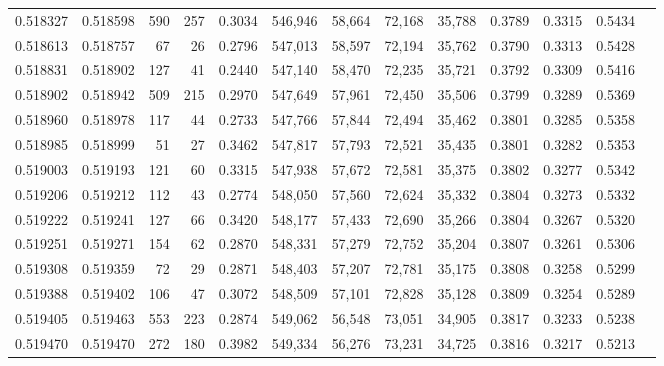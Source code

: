 \begin{tabular}{rrrrrrrrrrrrr}
0.518327 & 0.518598 &   590 &   257 &                                     0.3034 & 546,946 &  58,664 &  72,168 &  35,788 & 0.3789 & 0.3315 & 0.5434 \\
0.518613 & 0.518757 &    67 &    26 &                                     0.2796 & 547,013 &  58,597 &  72,194 &  35,762 & 0.3790 & 0.3313 & 0.5428 \\
0.518831 & 0.518902 &   127 &    41 &                                     0.2440 & 547,140 &  58,470 &  72,235 &  35,721 & 0.3792 & 0.3309 & 0.5416 \\
0.518902 & 0.518942 &   509 &   215 &                                     0.2970 & 547,649 &  57,961 &  72,450 &  35,506 & 0.3799 & 0.3289 & 0.5369 \\
0.518960 & 0.518978 &   117 &    44 &                                     0.2733 & 547,766 &  57,844 &  72,494 &  35,462 & 0.3801 & 0.3285 & 0.5358 \\
0.518985 & 0.518999 &    51 &    27 &                                     0.3462 & 547,817 &  57,793 &  72,521 &  35,435 & 0.3801 & 0.3282 & 0.5353 \\
0.519003 & 0.519193 &   121 &    60 &                                     0.3315 & 547,938 &  57,672 &  72,581 &  35,375 & 0.3802 & 0.3277 & 0.5342 \\
0.519206 & 0.519212 &   112 &    43 &                                     0.2774 & 548,050 &  57,560 &  72,624 &  35,332 & 0.3804 & 0.3273 & 0.5332 \\
0.519222 & 0.519241 &   127 &    66 &                                     0.3420 & 548,177 &  57,433 &  72,690 &  35,266 & 0.3804 & 0.3267 & 0.5320 \\
0.519251 & 0.519271 &   154 &    62 &                                     0.2870 & 548,331 &  57,279 &  72,752 &  35,204 & 0.3807 & 0.3261 & 0.5306 \\
0.519308 & 0.519359 &    72 &    29 &                                     0.2871 & 548,403 &  57,207 &  72,781 &  35,175 & 0.3808 & 0.3258 & 0.5299 \\
0.519388 & 0.519402 &   106 &    47 &                                     0.3072 & 548,509 &  57,101 &  72,828 &  35,128 & 0.3809 & 0.3254 & 0.5289 \\
0.519405 & 0.519463 &   553 &   223 &                                     0.2874 & 549,062 &  56,548 &  73,051 &  34,905 & 0.3817 & 0.3233 & 0.5238 \\
0.519470 & 0.519470 &   272 &   180 &                                     0.3982 & 549,334 &  56,276 &  73,231 &  34,725 & 0.3816 & 0.3217 & 0.5213 \\

\end{tabular}
